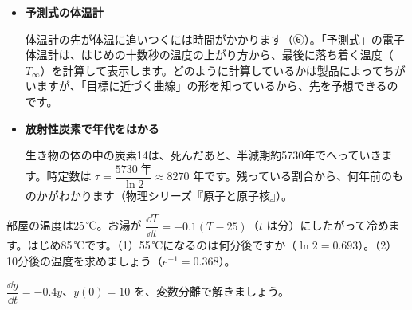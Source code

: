 \begin{butsuri}
\begin{itemize}[leftmargin=1.2\zw, itemsep=3pt, topsep=0pt, label={\color{bkPurple}●}]
\item \textbf{予測式の体温計}\par\noindent\begin{minipage}[c]{0.72\linewidth}
体温計の先が体温に追いつくには時間がかかります（⑥）。「予測式」の電子体温計は、はじめの十数秒の温度の上がり方から、最後に落ち着く温度（$T_\infty$）を計算して表示します。どのように計算しているかは製品によってちがいますが、「目標に近づく曲線」の形を知っているから、先を予想できるのです。
\end{minipage}\hfill
\begin{minipage}[c]{0.25\linewidth}\centering
{}
\end{minipage}
\item \textbf{放射性炭素で年代をはかる}\par\noindent 生き物の体の中の炭素14は、死んだあと、半減期約5730年でへっていきます。時定数は $\tau=\dfrac{5730\ \text{年}}{\ln2}\approx8270$ 年です。残っている割合から、何年前のものかがわかります（物理シリーズ『原子と原子核』）。
\end{itemize}
\end{butsuri}




\bkendproblems
{}

\bkproblem 部屋の温度は25\,℃。お湯が $\dfrac{\dd T}{\dd t}=-0.1(T-25)$（$t$ は分）にしたがって冷めます。はじめ85\,℃です。（1）55\,℃になるのは何分後ですか（$\ln2=0.693$）。（2）10分後の温度を求めましょう（$e^{-1}=0.368$）。

\bkproblem $\dfrac{\dd y}{\dd t}=-0.4y$、$y(0)=10$ を、変数分離で解きましょう。

